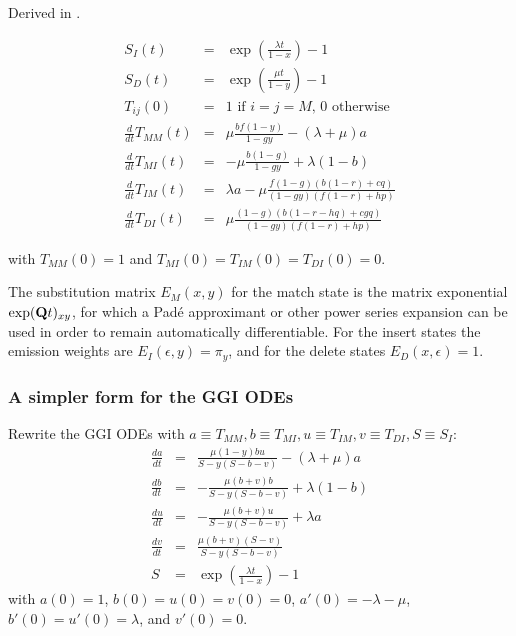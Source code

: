 \documentclass{article}
\begin{document}
Derived in \cite{Holmes2020}.

\begin{eqnarray*}
S_I(t) & = & \exp\left(\frac{\lambda t}{1-x}\right)-1 \\
S_D(t) & = & \exp\left(\frac{\mu t}{1-y}\right)-1 \\
 T_{ij}(0) & = & \mbox{1 if $i=j=M$, 0 otherwise}
\\
  \frac{d}{dt} T_{MM}(t) & = &
  \mu \frac{b f (1-y)}{1 - g y}-(\lambda +\mu )a
  \nonumber \\
  \frac{d}{dt} T_{MI}(t) & = &
  -\mu \frac{b (1-g)}{1 - g y} + \lambda (1-b)
  \nonumber \\
  \frac{d}{dt} T_{IM}(t) & = &
  \lambda a - \mu \frac{f (1-g) (b (1-r)+c q)}{(1 - g y) (f (1-r)+h p)}
  \nonumber \\
  \frac{d}{dt} T_{DI}(t) & = &
  \mu \frac{(1-g) (b (1-r-h q)+c g q)}{(1-g y) (f (1-r)+h p)}
\end{eqnarray*}

with $T_{MM}(0)=1$ and $T_{MI}(0)=T_{IM}(0)=T_{DI}(0)=0$.

The substitution matrix $E_M(x,y)$ for the match state is
the matrix exponential $\exp({\bf Q}t)_{xy}$, for which a Pad\'{e} approximant
or other power series expansion can be used in order to remain automatically differentiable. %
For the insert states the emission weights are $E_I(\epsilon,y)=\pi_y$,
and for the delete states $E_D(x,\epsilon)=1$.

\subsubsection{A simpler form for the GGI ODEs}

Rewrite the GGI ODEs with $a \equiv T_{MM}, b \equiv T_{MI}, u \equiv T_{IM}, v \equiv T_{DI}, S \equiv S_I$:
\begin{eqnarray*}
  \frac{da}{dt} & = & \frac{\mu (1-y) b u}{S - y(S-b-v)} - (\lambda +\mu ) a \\
  \frac{db}{dt} & = & -\frac{\mu (b+v) b}{S - y(S-b-v)} + \lambda (1-b) \\
  \frac{du}{dt} & = & -\frac{\mu (b+v) u}{S - y(S-b-v)} + \lambda a \\
  \frac{dv}{dt} & = & \frac{\mu (b+v) (S-v)}{S - y(S-b-v)} \\
  S & = & \exp\left(\frac{\lambda t}{1-x}\right)-1
\end{eqnarray*}
with $a(0)=1$, $b(0)=u(0)=v(0)=0$,
$a'(0)=-\lambda-\mu$, $b'(0)=u'(0)=\lambda$, and $v'(0)=0$.
\end{document}
